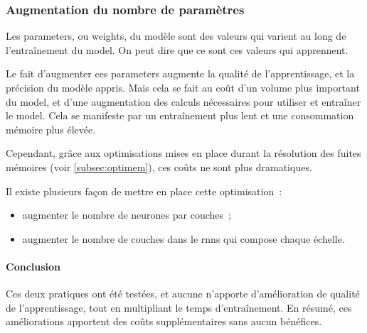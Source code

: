 \subsubsection{Augmentation du nombre de paramètres}\label{subsec:optiparam}
Les \glspl{parameter}, ou \glspl{weight}, du modèle sont des valeurs qui varient au long de l'entraînement du \gls{model}. On peut dire que ce sont ces valeurs qui \og apprennent\fg{}.

Le fait d'augmenter ces \glspl{parameter} augmente la qualité de l'apprentissage, et la précision du modèle appris. Mais cela se fait au coût d'un volume plus important du \gls{model}, et d'une augmentation des calculs nécessaires pour utiliser et entraîner le \gls{model}. Cela se manifeste par un entraînement plus lent et une consommation mémoire plus élevée.

Cependant, grâce aux optimisations mises en place durant la résolution des fuites mémoires (voir \autoref{subsec:optimem}), ces coûts ne sont plus dramatiques.

Il existe plusieurs façon de mettre en place cette optimisation~:
\begin{itemize}
	\item augmenter le nombre de neurones par couches~;
	\item augmenter le nombre de couches dans le \glspl{rnn} qui compose chaque \og échelle\fg{}.
\end{itemize}

\paragraph{Conclusion}
Ces deux pratiques ont été testées, et aucune n'apporte d'amélioration de qualité de l'apprentissage, tout en multipliant le temps d'entraînement.
En résumé, ces améliorations apportent des coûts supplémentaires sans aucun bénéfices.